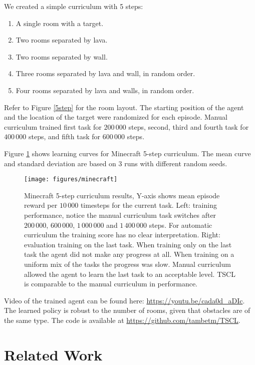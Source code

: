 \documentclass{article}
\begin{document}
We created a simple curriculum with 5 steps:

\begin{enumerate}
\item 
A single room with a target.

\item  
Two rooms separated by lava.

\item  
Two rooms separated by wall.

\item  
Three rooms separated by lava and wall, in random order.

\item  
Four rooms separated by lava and walls, in random order.
\end{enumerate}

Refer to Figure \ref{5step} for the room layout. The starting position of the agent and the location of the target were randomized for each episode. Manual curriculum trained first task for $200\,000$ steps, second, third and fourth task for $400\,000$ steps, and fifth task for $600\,000$ steps.

Figure \ref{f11} shows learning curves for Minecraft 5-step curriculum. The mean curve and standard deviation are based on 3 runs with different random seeds.

\begin{figure}[h]
  \texttt{[image: figures/minecraft]}
\caption{Minecraft 5-step curriculum results, Y-axis shows mean episode reward per $10\,000$ timesteps for the current task. Left: training performance, notice the manual curriculum task switches after $200\,000$, $600\,000$, $1\,000\,000$ and $1\,400\,000$ steps. For automatic curriculum the training score has no clear interpretation. Right: evaluation training on the last task. When training only on the last task the agent did not make any progress at all. When training on a uniform mix of the tasks the progress was slow. Manual curriculum allowed the agent to learn the last task to an acceptable level. TSCL is comparable to the manual curriculum in performance.}
\label{f11}
\end{figure}

Video of the trained agent can be found here: \url{https://youtu.be/cada0d_aDIc}. The learned policy is robust to the number of rooms, given that obstacles are of the same type. The code is available at \url{https://github.com/tambetm/TSCL}.


\section{Related Work}
\end{document}
